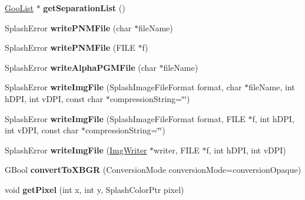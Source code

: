 \begin{DoxyCompactItemize}
\hyperlink{class_goo_list}{Goo\+List} $\ast$ {\bfseries get\+Separation\+List} ()
\item 
\mbox{\label{class_splash_bitmap_af35fb4faf4670b1e0cd2558f25529d3b}} 
Splash\+Error {\bfseries write\+P\+N\+M\+File} (char $\ast$file\+Name)
\item 
\mbox{\label{class_splash_bitmap_ab65d81264d4199b025bdf4f531c02897}} 
Splash\+Error {\bfseries write\+P\+N\+M\+File} (F\+I\+LE $\ast$f)
\item 
\mbox{\label{class_splash_bitmap_a727e76e9e31f8a4a5488b5f40c3b9aaa}} 
Splash\+Error {\bfseries write\+Alpha\+P\+G\+M\+File} (char $\ast$file\+Name)
\item 
\mbox{\label{class_splash_bitmap_a2bd0b7fd0b98ca8e36d6cfb9b84ddd27}} 
Splash\+Error {\bfseries write\+Img\+File} (Splash\+Image\+File\+Format format, char $\ast$file\+Name, int h\+D\+PI, int v\+D\+PI, const char $\ast$compression\+String=\char`\"{}\char`\"{})
\item 
\mbox{\label{class_splash_bitmap_a047e81f3b438b8c19916f25cfd96bcbd}} 
Splash\+Error {\bfseries write\+Img\+File} (Splash\+Image\+File\+Format format, F\+I\+LE $\ast$f, int h\+D\+PI, int v\+D\+PI, const char $\ast$compression\+String=\char`\"{}\char`\"{})
\item 
\mbox{\label{class_splash_bitmap_a5199a5cc6cd45218e75167083e09a6ec}} 
Splash\+Error {\bfseries write\+Img\+File} (\hyperlink{class_img_writer}{Img\+Writer} $\ast$writer, F\+I\+LE $\ast$f, int h\+D\+PI, int v\+D\+PI)
\item 
\mbox{\label{class_splash_bitmap_ac141c35c3af4eb3bc35350f1fe825f54}} 
G\+Bool {\bfseries convert\+To\+X\+B\+GR} (Conversion\+Mode conversion\+Mode=conversion\+Opaque)
\item 
\mbox{\label{class_splash_bitmap_ae72b4345b2ad05a87a5633699617b714}} 
void {\bfseries get\+Pixel} (int x, int y, Splash\+Color\+Ptr pixel)
\item 
\mbox{\label{class_splash_bitmap_a7d74f74249b0e52c770ef3113c958886}} 

\end{DoxyCompactItemize}

